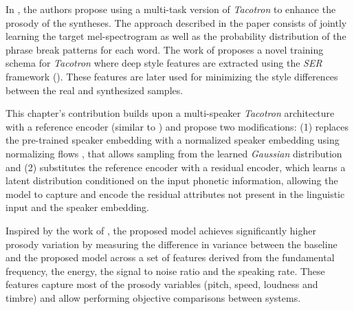 In \autocite{liu2020c}, the authors propose using a multi-task version of \textit{Tacotron} to enhance the prosody of the syntheses. The approach described in the paper consists of jointly learning the target mel-spectrogram as well as the probability distribution of the phrase break patterns for each word. The work of \autocite{liu2020c} proposes a novel training schema for \textit{Tacotron} where deep style features are extracted using the \textit{SER} framework (\autocite{Zhang2018, Lotfian2019}). These features are later used for minimizing the style differences between the real and synthesized samples.

This chapter's contribution builds upon a multi-speaker \textit{Tacotron} architecture with a reference encoder (similar to \autocite{skerryryan2018}) and propose two modifications: (1) replaces the pre-trained speaker embedding with a normalized speaker embedding using normalizing flows \autocite{kingma2018}, that allows sampling from the learned \textit{Gaussian} distribution and (2)  substitutes the reference encoder with a residual encoder, which learns a latent distribution conditioned on the input phonetic information, allowing the model to capture and encode the residual attributes not present in the linguistic input and the speaker embedding.

Inspired by the work of \autocite{Raitio2020}, the proposed model achieves significantly higher prosody variation by measuring the difference in variance between the baseline and the proposed model across a set of features derived from the fundamental frequency, the energy, the signal to noise ratio and the speaking rate. These features capture most of the prosody variables (pitch, speed, loudness and timbre) \autocite{Raitio2020} and allow performing objective comparisons between systems.


